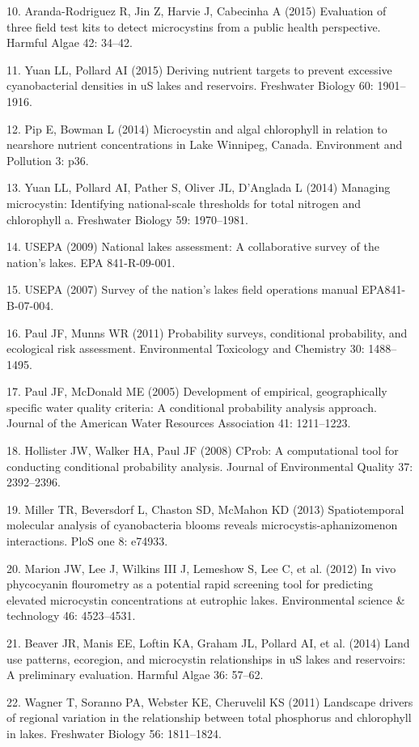 \documentclass[11pt,]{article}
\begin{document}
\hypertarget{ref-aranda2015evaluation}{}
10. Aranda-Rodriguez R, Jin Z, Harvie J, Cabecinha A (2015) Evaluation
of three field test kits to detect microcystins from a public health
perspective. Harmful Algae 42: 34--42.

\hypertarget{ref-yuan2015deriving}{}
11. Yuan LL, Pollard AI (2015) Deriving nutrient targets to prevent
excessive cyanobacterial densities in uS lakes and reservoirs.
Freshwater Biology 60: 1901--1916.

\hypertarget{ref-pip2014microcystin}{}
12. Pip E, Bowman L (2014) Microcystin and algal chlorophyll in relation
to nearshore nutrient concentrations in Lake Winnipeg, Canada.
Environment and Pollution 3: p36.

\hypertarget{ref-yuan2014managing}{}
13. Yuan LL, Pollard AI, Pather S, Oliver JL, D'Anglada L (2014)
Managing microcystin: Identifying national-scale thresholds for total
nitrogen and chlorophyll a. Freshwater Biology 59: 1970--1981.

\hypertarget{ref-usepa2009national}{}
14. USEPA (2009) National lakes assessment: A collaborative survey of
the nation's lakes. EPA 841-R-09-001.

\hypertarget{ref-nlaux5ffieldops}{}
15. USEPA (2007) Survey of the nation's lakes field operations manual
EPA841-B-07-004.

\hypertarget{ref-paul2011probability}{}
16. Paul JF, Munns WR (2011) Probability surveys, conditional
probability, and ecological risk assessment. Environmental Toxicology
and Chemistry 30: 1488--1495.

\hypertarget{ref-paul2005development}{}
17. Paul JF, McDonald ME (2005) Development of empirical, geographically
specific water quality criteria: A conditional probability analysis
approach. Journal of the American Water Resources Association 41:
1211--1223.

\hypertarget{ref-hollister2008cprob}{}
18. Hollister JW, Walker HA, Paul JF (2008) CProb: A computational tool
for conducting conditional probability analysis. Journal of
Environmental Quality 37: 2392--2396.

\hypertarget{ref-miller2013spatiotemporal}{}
19. Miller TR, Beversdorf L, Chaston SD, McMahon KD (2013)
Spatiotemporal molecular analysis of cyanobacteria blooms reveals
microcystis-aphanizomenon interactions. PloS one 8: e74933.

\hypertarget{ref-marion2012vivo}{}
20. Marion JW, Lee J, Wilkins III J, Lemeshow S, Lee C, et al. (2012) In
vivo phycocyanin flourometry as a potential rapid screening tool for
predicting elevated microcystin concentrations at eutrophic lakes.
Environmental science \& technology 46: 4523--4531.

\hypertarget{ref-beaver2014land}{}
21. Beaver JR, Manis EE, Loftin KA, Graham JL, Pollard AI, et al. (2014)
Land use patterns, ecoregion, and microcystin relationships in uS lakes
and reservoirs: A preliminary evaluation. Harmful Algae 36: 57--62.

\hypertarget{ref-wagner2011landscape}{}
22. Wagner T, Soranno PA, Webster KE, Cheruvelil KS (2011) Landscape
drivers of regional variation in the relationship between total
phosphorus and chlorophyll in lakes. Freshwater Biology 56: 1811--1824.
\end{document}

